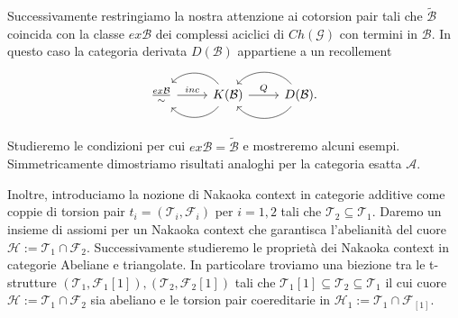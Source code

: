 Successivamente restringiamo la nostra attenzione ai cotorsion pair tali che $\widetilde{\mathcal{B}}$ coincida con la classe $ex\mathcal{B}$ dei complessi aciclici di $Ch(\mathcal{G})$ con termini in $\mathcal{B}$. In questo caso la categoria derivata $D(\mathcal{B})$ appartiene a un recollement
\begin{equation*}
  \begin{tikzcd}
    \frac{ex\mathcal{B}}{\sim}\arrow{r}{inc}
    & K(\mathcal{B})\arrow[bend left=50]{l}\arrow[bend right=50]{l}\arrow{r}{Q}
    & D(\mathcal{B}).\arrow[bend left=50]{l}\arrow[bend right=50]{l}
  \end{tikzcd}
\end{equation*}

Studieremo le condizioni per cui $ex\mathcal{B}=\widetilde{\mathcal{B}}$ e mostreremo alcuni esempi. Simmetricamente dimostriamo risultati analoghi per la categoria esatta $\mathcal{A}$.

Inoltre, introduciamo la nozione di Nakaoka context in categorie additive come coppie di torsion pair $t_i=(\mathcal{T}_i,\mathcal{F}_i)$ per $i=1,2$ tali che $\mathcal{T}_2\subseteq \mathcal{T}_1$. Daremo un insieme di assiomi per un Nakaoka context che garantisca l'abelianit\`a del cuore $\mathcal{H}:=\mathcal{T}_1\cap\mathcal{F}_2$. Successivamente studieremo le propriet\`a dei Nakaoka context in categorie Abeliane e triangolate. In particolare troviamo una biezione tra le t-strutture $(\mathcal{T}_1,\mathcal{F}_1[1]), (\mathcal{T}_2,\mathcal{F}_2[1])$ tali che $\mathcal{T}_1[1]\subseteq\mathcal{T}_2\subseteq\mathcal{T}_1$ il cui cuore $\mathcal{H}:=\mathcal{T}_1\cap\mathcal{F}_2$ sia abeliano e le torsion pair coereditarie in $\mathcal{H}_1:=\mathcal{T}_1\cap\mathcal{F}_[1]$.


\endgroup


\vfill
